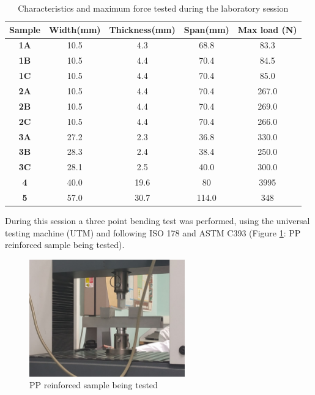 \begin{table}[]
\centering
\begin{tabular}{ccccc}
\hline
\textbf{Sample} & \textbf{Width(mm)} & \textbf{Thickness(mm)} & \textbf{Span(mm)} & \textbf{Max load (N)} \\ \hline
\textbf{1A}     & 10.5               & 4.3                    & 68.8              & 83.3                   \\ \hline
\textbf{1B}     & 10.5               & 4.4                    & 70.4              & 84.5                   \\ \hline
\textbf{1C}     & 10.5               & 4.4                    & 70.4              & 85.0                   \\ \hline
\textbf{2A}     & 10.5               & 4.4                    & 70.4              & 267.0                  \\ \hline
\textbf{2B}     & 10.5               & 4.4                    & 70.4              & 269.0                  \\ \hline
\textbf{2C}     & 10.5               & 4.4                    & 70.4              & 266.0                  \\ \hline
\textbf{3A}     & 27.2               & 2.3                    & 36.8              & 330.0                  \\ \hline
\textbf{3B}     & 28.3               & 2.4                    & 38.4              & 250.0                  \\ \hline
\textbf{3C}     & 28.1               & 2.5                    & 40.0              & 300.0                  \\ \hline
\textbf{4}      & 40.0               & 19.6                   & 80                & 3995                   \\ \hline
\textbf{5}      & 57.0               & 30.7                   & 114.0             & 348			\\ \hline
\end{tabular}
\caption{Characteristics and maximum force tested during the laboratory session}
\label{tab:characteristics}
\end{table}

During this session a three point bending test was performed, using the universal
testing machine (UTM) and following ISO 178 and ASTM C393 (Figure \ref{fig:machine}:
PP reinforced sample being tested).

\begin{figure}[h]
	\centering
	\includegraphics[width=0.6\textwidth]{img/machine.jpg}
	\caption{PP reinforced sample being tested}
	\label{fig:machine}
\end{figure}

